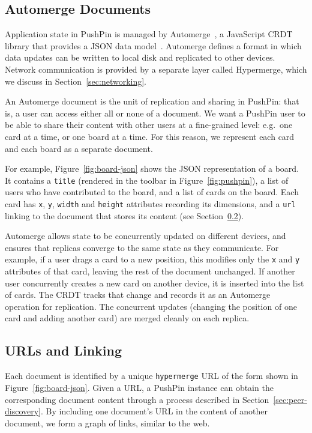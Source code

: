 \documentclass[sigplan,10pt]{acmart}
\begin{document}
\subsection{Automerge Documents}\label{sec:documents}

Application state in PushPin is managed by Automerge~\cite{Automerge:2018,Automerge,LocalFirst}, a JavaScript CRDT library that provides a JSON data model~\cite{Kleppmann:2017ca}.
Automerge defines a format in which data updates can be written to local disk and replicated to other devices.
Network communication is provided by a separate layer called Hypermerge, which we discuss in Section~\ref{sec:networking}.

An Automerge document is the unit of replication and sharing in PushPin: that is, a user can access either all or none of a document.
We want a PushPin user to be able to share their content with other users at a fine-grained level: e.g.\ one card at a time, or one board at a time.
For this reason, we represent each card and each board as a separate document.

For example, Figure~\ref{fig:board-json} shows the JSON representation of a board.
It contains a \texttt{title} (rendered in the toolbar in Figure~\ref{fig:pushpin}), a list of users who have contributed to the board, and a list of cards on the board.
Each card has \texttt{x}, \texttt{y}, \texttt{width} and \texttt{height} attributes recording its dimensions, and a \texttt{url} linking to the document that stores its content (see Section~\ref{sec:urls}).

Automerge allows state to be concurrently updated on different devices, and ensures that replicas converge to the same state as they communicate.
For example, if a user drags a card to a new position, this modifies only the \texttt{x} and \texttt{y} attributes of that card, leaving the rest of the document unchanged.
If another user concurrently creates a new card on another device, it is inserted into the list of cards.
The CRDT tracks that change and records it as an Automerge operation for replication.
The concurrent updates (changing the position of one card and adding another card) are merged cleanly on each replica.

\subsection{URLs and Linking}\label{sec:urls}

Each document is identified by a unique \texttt{hypermerge} URL of the form shown in Figure~\ref{fig:board-json}.
Given a URL, a PushPin instance can obtain the corresponding document content through a process described in Section~\ref{sec:peer-discovery}.
By including one document's URL in the content of another document, we form a graph of links, similar to the web.
\end{document}
